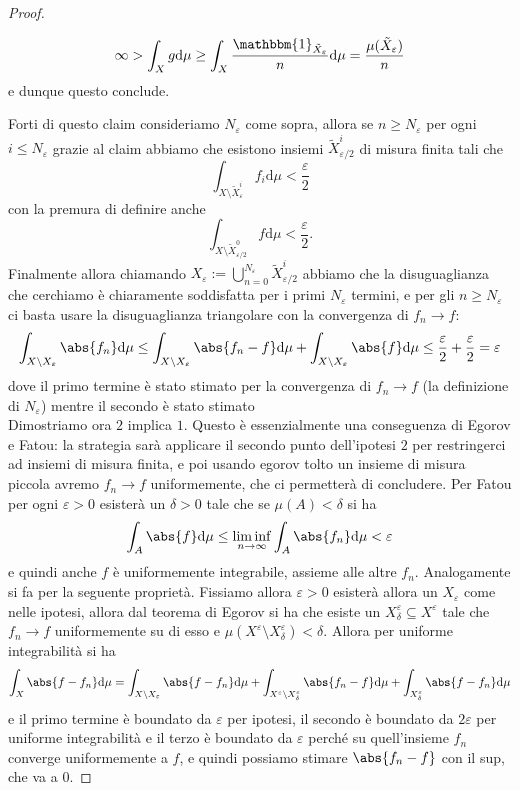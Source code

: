\documentclass[11pt]{scrartcl}
\newcommand{\dif}{\text{d}}
\begin{document}
\begin{proof}
\begin{subproof}[Sottodimostrazione]
			$$\infty > \int_X g\dif \mu \ge \int_X \frac{\mathbbm{1}_{\tilde{X}_\varepsilon}}{n} \dif \mu = \frac{\mu(\tilde{X}_\varepsilon)}{n}$$
			e dunque questo conclude.
		\end{subproof}
		Forti di questo claim consideriamo $N_\varepsilon$ come sopra, allora se $n\ge N_\varepsilon$ per ogni $i\le N_\varepsilon$ grazie al claim abbiamo che esistono insiemi $\tilde{X}^i_{\varepsilon/2}$ di misura finita tali che 
		$$\int_{X\setminus \tilde{X}^i_\varepsilon}f_i\dif \mu<\frac{\varepsilon}{2}$$
		con la premura di definire anche 
		$$\int_{X\setminus \tilde{X}^0_{\varepsilon/2}} f\dif \mu <\frac{\varepsilon}{2}.$$
		Finalmente allora chiamando $X_\varepsilon:=\bigcup_{n=0}^{N_\varepsilon} \tilde{X}_{\varepsilon/2}^i$ abbiamo che la disuguaglianza che cerchiamo è chiaramente soddisfatta per i primi $N_\varepsilon$ termini, e per gli $n\ge N_\varepsilon$ ci basta usare la disuguaglianza triangolare con la convergenza di $f_n\to f$:
		$$\int_{X\setminus X_\varepsilon} \abs{f_n}\dif \mu \le \int_{X\setminus X_\varepsilon}\abs{f_n-f}\dif \mu  + \int_{X\setminus X_\varepsilon}\abs{f}\dif \mu \le \frac{\varepsilon}{2}+\frac{\varepsilon}{2}=\varepsilon$$
		dove il primo termine è stato stimato per la convergenza di $f_n\to f$ (la definizione di $N_\varepsilon$) mentre il secondo è stato stimato 
		\\
		Dimostriamo ora $2$ implica $1$. Questo è essenzialmente una conseguenza di Egorov e Fatou: la strategia sarà applicare il secondo punto dell'ipotesi $2$ per restringerci ad insiemi di misura finita, e poi usando egorov tolto un insieme di misura piccola avremo $f_n\to f$ uniformemente, che ci permetterà di concludere. Per Fatou per ogni $\varepsilon>0$ esisterà un $\delta>0$ tale che se $\mu(A)<\delta$ si ha
		$$\int_A \abs{f}\dif \mu \le \liminf_{n\to\infty}\int_A \abs{f_n}\dif \mu<\varepsilon$$
		e quindi anche $f$ è uniformemente integrabile, assieme alle altre $f_n$. Analogamente si fa per la seguente proprietà. Fissiamo allora $\varepsilon>0$ esisterà allora un $X_\varepsilon$ come nelle ipotesi, allora dal teorema di Egorov si ha che esiste un $X_\delta^\varepsilon\subseteq X^\varepsilon$ tale che $f_n\to f$ uniformemente su di esso e $\mu(X^\varepsilon\setminus X_\delta^\varepsilon)<\delta$. Allora per uniforme integrabilità si ha
		$$\int_X \abs{f-f_n}\dif \mu =\int_{X\setminus X_\varepsilon} \abs{f-f_n}\dif \mu + \int_{X^\varepsilon\setminus X^\varepsilon_\delta} \abs{f_n-f}\dif \mu + \int_{X^\varepsilon_\delta}\abs{f-f_n}\dif \mu$$
		e il primo termine è boundato da $\varepsilon$ per ipotesi, il secondo è boundato da $2\varepsilon$ per uniforme integrabilità e il terzo è boundato da $\varepsilon$ perché su quell'insieme $f_n$ converge uniformemente a $f$, e quindi possiamo stimare $\abs{f_n-f}$ con il sup, che va a $0$.
	\end{proof}
\end{document}
